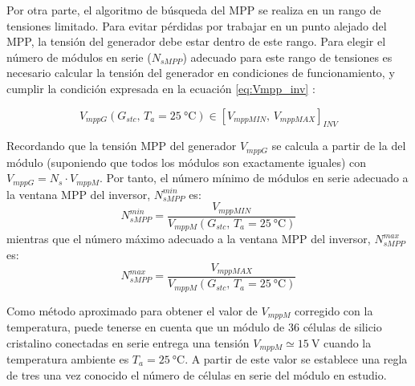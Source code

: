 Por otra parte, el algoritmo de búsqueda del MPP se realiza en un
rango de tensiones limitado. Para evitar pérdidas por trabajar en
un punto alejado del MPP, la tensión del generador debe estar dentro
de este rango. Para elegir el número de módulos en serie ($N_{sMPP}$)
adecuado para este rango de tensiones es necesario calcular la tensión
del generador en condiciones de funcionamiento, y cumplir la condición
expresada en la ecuación
\ref{eq:Vmpp_inv}
: 

\begin{equation}
V_{mppG}(G_{stc},\, T_{a}=\SI{25}{\celsius})\in\left[V_{mppMIN},\,
  V_{mppMAX}\right]_{INV}\label{eq:Vmpp_inv}
\end{equation}

Recordando que la tensión MPP del generador $V_{mppG}$ se calcula a partir de la del módulo 
(suponiendo que todos los módulos son exactamente iguales) con
$V_{mppG}=N_{s}\cdot V_{mppM}$. Por tanto, el número mínimo de módulos en serie adecuado a la ventana
MPP del inversor, $N_{sMPP}^{min}$ es:
\begin{equation}
  \label{eq:Ns_mpp_min}
  N_{sMPP}^{min}=\frac{V_{mppMIN}}{V_{mppM}(G_{stc},\, T_{a}=\SI{25}{\celsius})}
\end{equation}
mientras que el número máximo adecuado a la ventana MPP del inversor, $N_{sMPP}^{max}$ es:
\begin{equation}
  \label{eq:Ns_mpp_max}
  N_{sMPP}^{max}=\frac{V_{mppMAX}}{V_{mppM}(G_{stc},\, T_{a}=\SI{25}{\celsius})}
\end{equation}

Como método aproximado para obtener el valor de $V_{mppM}$ corregido
con la temperatura, puede tenerse en cuenta que un módulo de 36 células
de silicio cristalino conectadas en serie entrega una tensión $V_{mppM}\simeq\SI{15}{\volt}$
cuando la temperatura ambiente es $T_{a}=\SI{25}{\celsius}$. A partir
de este valor se establece una regla de tres una vez conocido el número
de células en serie del módulo en estudio. 

